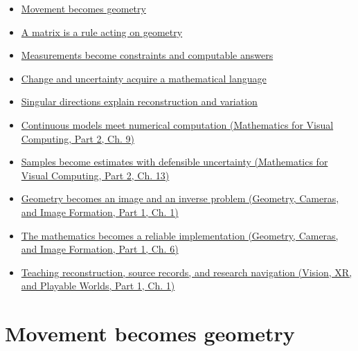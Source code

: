 \begin{itemize}
\tightlist
\item
  \hyperref[01-foundations-i-ch017-movement-becomes-geometry]{Movement becomes geometry}
\item
  \hyperref[01-foundations-i-ch018-a-matrix-is-a-rule-acting-on-geometry]{A matrix is a rule acting on geometry}
\item
  \hyperref[01-foundations-i-ch019-measurements-become-constraints-and-computable-answers]{Measurements become constraints and computable answers}
\item
  \hyperref[01-foundations-i-ch020-change-and-uncertainty-acquire-a-mathematical-language]{Change and uncertainty acquire a mathematical language}
\item
  \hyperref[02-foundations-ii-ch024-singular-directions-explain-reconstruction-and-variation]{Singular directions explain reconstruction and variation}
\item
  \href{../02-Mathematics-for-Visual-Computing-P02/main.pdf\#nameddest=02-foundations-ii-ch025-continuous-models-meet-numerical-computation}{Continuous models meet numerical computation (Mathematics for Visual Computing, Part 2, Ch. 9)}
\item
  \href{../02-Mathematics-for-Visual-Computing-P02/main.pdf\#nameddest=02-foundations-ii-ch029-samples-become-estimates-with-defensible-uncertainty}{Samples become estimates with defensible uncertainty (Mathematics for Visual Computing, Part 2, Ch. 13)}
\item
  \href{../03-Geometry-Cameras-and-Image-Formation-P01/main.pdf\#nameddest=02-foundations-ii-ch032-geometry-becomes-an-image-and-an-inverse-problem-1}{Geometry becomes an image and an inverse problem (Geometry, Cameras, and Image Formation, Part 1, Ch. 1)}
\item
  \href{../03-Geometry-Cameras-and-Image-Formation-P01/main.pdf\#nameddest=02-foundations-ii-ch037-the-mathematics-becomes-a-reliable-implementation}{The mathematics becomes a reliable implementation (Geometry, Cameras, and Image Formation, Part 1, Ch. 6)}
\item
  \href{../07-Vision-XR-and-Playable-Worlds-P01/main.pdf\#nameddest=02-foundations-ii-ch039-teaching-reconstruction-source-records-and-research-navigation}{Teaching reconstruction, source records, and research navigation (Vision, XR, and Playable Worlds, Part 1, Ch. 1)}
\end{itemize}

\section{Movement becomes geometry}\label{01-foundations-i-ch017-movement-becomes-geometry}

